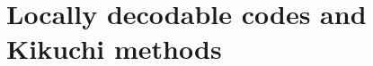 \chapter{Locally decodable codes and Kikuchi methods}
\label{chapter:locally-decodable-codes}







